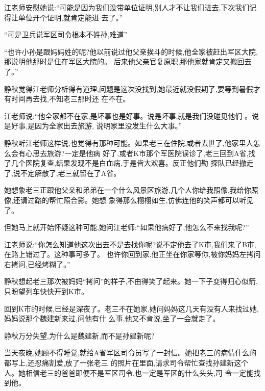 ﻿\documentclass[12pt]{article}
\begin{document}
江老师安慰她说:``可能是因为我们没带单位证明,别人才不让我们进去,下次我们记得让单位开个证明,就肯定能进
去了。''



``可是卫兵说军区司令根本不姓孙\myrule ,难道\myrule ''



``也许小孙是跟妈妈姓的呢?他以前说过他父亲挨斗的时候,他全家被赶出军区大院,那说明他那时是住在军区大院的。
后来他父亲官复原职,那他家就肯定又搬回去了。''



静秋觉得江老师分析得有道理,问题是这次没找到,她最近就没假期了,要等到暑假才有时间再去找,不知老三那时还
\myrule 在不在。



江老师说:``他全家都不在家,是坏事也是好事。说是坏事,就是我们没碰见他们 。说是好事,是因为全家出去旅游,
说明\myrule 家里没发生什么大事。''



静秋听江老师这样说,也觉得有那种可能。如果老三在住院,或者去世了,他家里人怎么会有心思去旅游?一定是他病
好了,或者K市那个军医院误诊了,老三回到A省,找了几个医院复查,结果发现不是白血病,于是皆大欢喜。反正他们勘
探队已经撤走了,说不定解散了,老三就留在了A省。



她想象老三正跟他父亲和弟弟在一个什么风景区旅游,几个人你给我照像,我给你照像,还请过路的帮忙照合影。她想
象得那么栩栩如生,仿佛连他的笑声都可以听见了。



但她马上就开始怀疑这种可能,她问江老师:``如果他病好了,他怎么不来找我呢?''



江老师说:``你怎么知道他这次出去不是去找你呢?说不定他去了K市,我们来了B市,在路上错过了。这种事可多了。
也许你回到家,他正坐在你家等你,被你妈妈左拷问右拷问,已经烤糊了。''



静秋想起老三那次被妈妈``拷问''的样子,不由得笑了起来。她一下子变得归心似箭,只盼望列车快快开到K市。



回到K市的时候,已经是深夜了。老三不在她家,她问妈妈这几天有没有人来找过她,妈妈说那个魏建新来过,问他有什
么事,他又不肯说,坐了一会就走了。



静秋万分失望,为什么是魏建新,而不是孙建新呢?



当天夜晚,她顾不得睡觉,就给A省军区司令员写了一封信。她把老三的病情什么的都写上,还忍痛割爱,放了一张老三
的照片在里面,请求司令帮忙查找孙建新这个人。她相信老三的爸爸即便不是军区司令,也一定是军区的什么头头,司
令一定能找到他。
\end{document}
